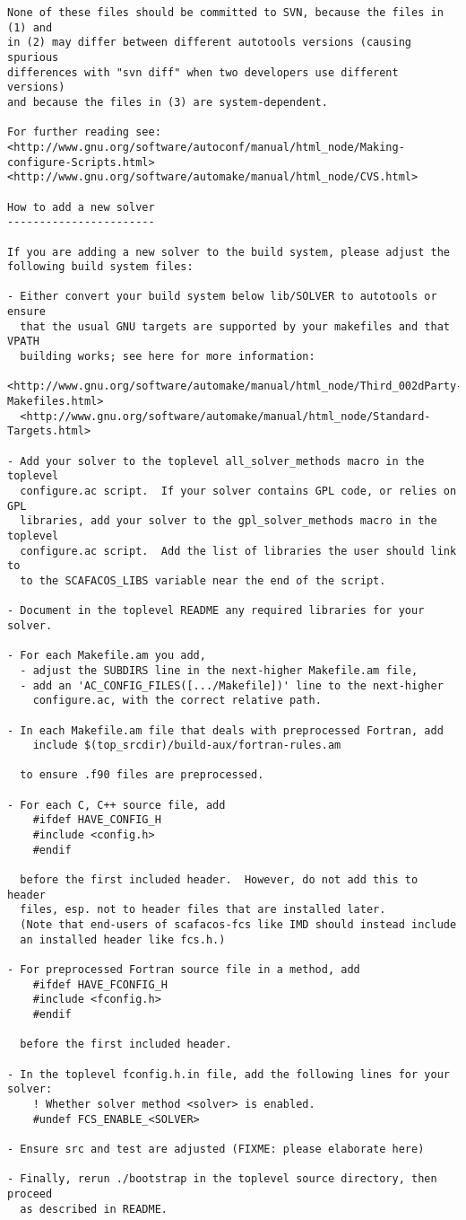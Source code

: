 \begin{verbatim}
None of these files should be committed to SVN, because the files in (1) and
in (2) may differ between different autotools versions (causing spurious
differences with "svn diff" when two developers use different versions)
and because the files in (3) are system-dependent.

For further reading see:
<http://www.gnu.org/software/autoconf/manual/html_node/Making-configure-Scripts.html>
<http://www.gnu.org/software/automake/manual/html_node/CVS.html>

How to add a new solver
-----------------------

If you are adding a new solver to the build system, please adjust the
following build system files:

- Either convert your build system below lib/SOLVER to autotools or ensure
  that the usual GNU targets are supported by your makefiles and that VPATH
  building works; see here for more information:
  <http://www.gnu.org/software/automake/manual/html_node/Third_002dParty-Makefiles.html>
  <http://www.gnu.org/software/automake/manual/html_node/Standard-Targets.html>

- Add your solver to the toplevel all_solver_methods macro in the toplevel
  configure.ac script.  If your solver contains GPL code, or relies on GPL
  libraries, add your solver to the gpl_solver_methods macro in the toplevel
  configure.ac script.  Add the list of libraries the user should link to
  to the SCAFACOS_LIBS variable near the end of the script.

- Document in the toplevel README any required libraries for your solver.

- For each Makefile.am you add,
  - adjust the SUBDIRS line in the next-higher Makefile.am file,
  - add an 'AC_CONFIG_FILES([.../Makefile])' line to the next-higher
    configure.ac, with the correct relative path.

- In each Makefile.am file that deals with preprocessed Fortran, add
    include $(top_srcdir)/build-aux/fortran-rules.am

  to ensure .f90 files are preprocessed.

- For each C, C++ source file, add
    #ifdef HAVE_CONFIG_H
    #include <config.h>
    #endif

  before the first included header.  However, do not add this to header
  files, esp. not to header files that are installed later.
  (Note that end-users of scafacos-fcs like IMD should instead include
  an installed header like fcs.h.)

- For preprocessed Fortran source file in a method, add
    #ifdef HAVE_FCONFIG_H
    #include <fconfig.h>
    #endif

  before the first included header.

- In the toplevel fconfig.h.in file, add the following lines for your solver:
    ! Whether solver method <solver> is enabled.
    #undef FCS_ENABLE_<SOLVER>

- Ensure src and test are adjusted (FIXME: please elaborate here)

- Finally, rerun ./bootstrap in the toplevel source directory, then proceed
  as described in README.
\end{verbatim}
